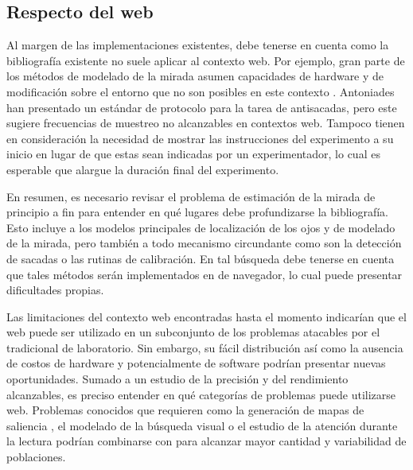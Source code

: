 \subsection{Respecto del \eyetracking web}

  Al margen de las implementaciones existentes, debe tenerse en cuenta como la
  bibliografía existente no suele aplicar al contexto web.
  Por ejemplo, gran parte de los métodos de modelado de la mirada asumen
  capacidades de hardware y de modificación sobre el entorno que no son
  posibles en este contexto \cite{hansen_2009_eye_of_the_beholder}.
  Antoniades \etal \cite{antoniades_2013_standarized_protocol} han presentado
  un estándar de protocolo para la tarea de antisacadas, pero este sugiere
  frecuencias de muestreo no alcanzables en contextos web.
  Tampoco tienen en consideración la necesidad de mostrar las instrucciones del
  experimento a su inicio en lugar de que estas sean indicadas por un
  experimentador, lo cual es esperable que alargue la duración final del
  experimento. 
  
  En resumen, es necesario revisar el problema de estimación de la mirada de
  principio a fin para entender en qué lugares debe profundizarse la
  bibliografía.
  Esto incluye a los modelos principales de localización de los ojos y de
  modelado de la mirada, pero también a todo mecanismo circundante como son la
  detección de sacadas o las rutinas de calibración.
  En tal búsqueda debe tenerse en cuenta que tales métodos serán implementados
  en \js de navegador, lo cual puede presentar dificultades propias.
  
  Las limitaciones del contexto web encontradas hasta el momento indicarían que
  el \eyetracking web puede ser utilizado en un subconjunto de los problemas
  atacables por el \eyetracking tradicional de laboratorio.
  Sin embargo, su fácil distribución así como la ausencia de costos de hardware
  y potencialmente de software podrían presentar nuevas oportunidades.
  Sumado a un estudio de la precisión y del rendimiento alcanzables, es preciso
  entender en qué categorías de problemas puede utilizarse \eyetracking web.
  Problemas conocidos que requieren \eyetracking como la generación de mapas de
  saliencia \cite{xu_2015_turker_gaze}, el modelado de la búsqueda visual
  \cite{clifton_2016_eye_movements_in_reading} o el estudio de la atención
  durante la lectura \cite{clifton_2016_eye_movements_in_reading} podrían
  combinarse con \crowdsourcing para alcanzar mayor cantidad y
  variabilidad de poblaciones.

